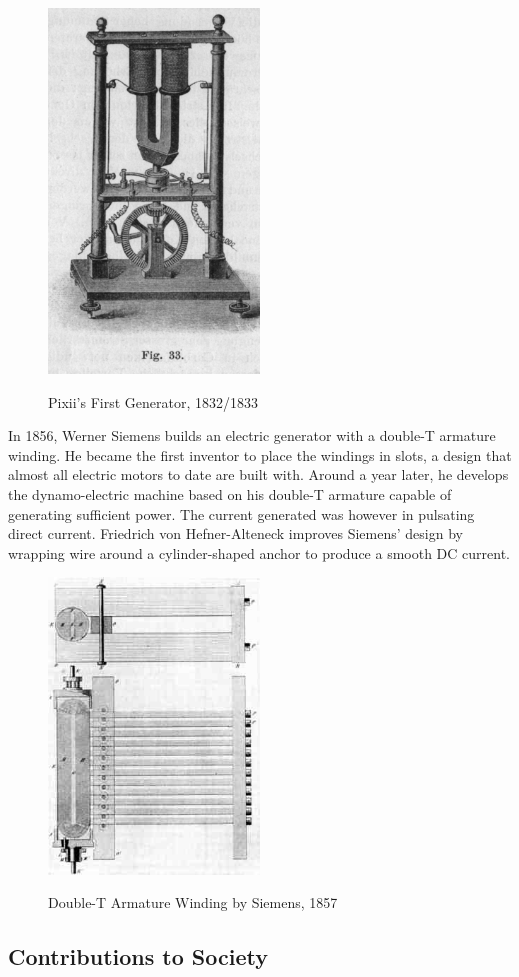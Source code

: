     \begin{figure}[ht]
        \begin{center}
            \includegraphics[width=0.5\textwidth]{figures/history/pixii.jpg}
            \label{fig:pixii} \caption{Pixii's First Generator, 1832/1833}
        \end{center}
    \end{figure}

    \noindent
    In 1856, Werner Siemens builds an electric generator with a double-T armature winding. He became the first inventor to place the windings in slots, a design that almost all electric motors to date are built with. \cite{needcite} Around a year later, he develops the dynamo-electric machine based on his double-T armature capable of generating sufficient power. The current generated was however in pulsating direct current. Friedrich von Hefner-Alteneck improves Siemens’ design by wrapping wire around a cylinder-shaped anchor to produce a smooth DC current. \cite{needcite} 

    \begin{figure}[ht]
        \begin{center}
            \includegraphics[width=0.5\textwidth]{figures/history/siemens.jpg}
            \label{fig:siemens} \caption{Double-T Armature Winding by Siemens, 1857}
        \end{center}
    \end{figure}

    \subsection{Contributions to Society}

